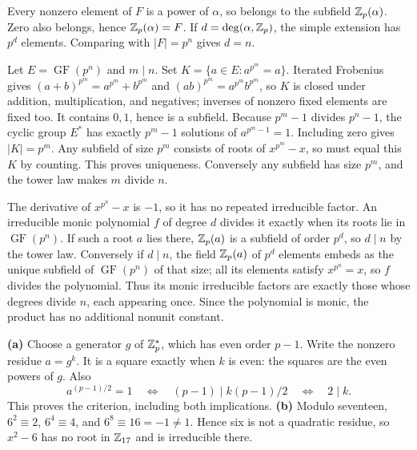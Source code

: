Every nonzero element of $F$ is a power of $\alpha$, so belongs to the subfield $\mathbb{Z}_p(\alpha)$. Zero also belongs, hence $\mathbb{Z}_p(\alpha)=F$. If $d=\deg(\alpha,\mathbb{Z}_p)$, the simple extension has $p^d$ elements. Comparing with $|F|=p^n$ gives $d=n$.

Let $E=\operatorname{GF}(p^n)$ and $m\mid n$. Set $K=\{a\in E:a^{p^m}=a\}$. Iterated Frobenius gives $(a+b)^{p^m}=a^{p^m}+b^{p^m}$ and $(ab)^{p^m}=a^{p^m}b^{p^m}$, so $K$ is closed under addition, multiplication, and negatives; inverses of nonzero fixed elements are fixed too. It contains $0,1$, hence is a subfield.
Because $p^m-1$ divides $p^n-1$, the cyclic group $E^*$ has exactly $p^m-1$ solutions of $a^{p^m-1}=1$. Including zero gives $|K|=p^m$.
Any subfield of size $p^m$ consists of roots of $x^{p^m}-x$, so must equal this $K$ by counting. This proves uniqueness. Conversely any subfield has size $p^m$, and the tower law makes $m$ divide $n$.

The derivative of $x^{p^n}-x$ is $-1$, so it has no repeated irreducible factor. An irreducible monic polynomial $f$ of degree $d$ divides it exactly when its roots lie in $\operatorname{GF}(p^n)$.
If such a root $a$ lies there, $\mathbb{Z}_p(a)$ is a subfield of order $p^d$, so $d\mid n$ by the tower law. Conversely if $d\mid n$, the field $\mathbb{Z}_p(a)$ of $p^d$ elements embeds as the unique subfield of $\operatorname{GF}(p^n)$ of that size; all its elements satisfy $x^{p^n}=x$, so $f$ divides the polynomial. Thus its monic irreducible factors are exactly those whose degrees divide $n$, each appearing once. Since the polynomial is monic, the product has no additional nonunit constant.

\textbf{(a)} Choose a generator $g$ of $\mathbb{Z}_p^*$, which has even order $p-1$. Write the nonzero residue $a=g^k$. It is a square exactly when $k$ is even: the squares are the even powers of $g$. Also
\[a^{(p-1)/2}=1\quad\Longleftrightarrow\quad(p-1)\mid k(p-1)/2\quad\Longleftrightarrow\quad2\mid k.\]
This proves the criterion, including both implications.
\textbf{(b)} Modulo seventeen, $6^2\equiv2$, $6^4\equiv4$, and $6^8\equiv16=-1\ne1$. Hence six is not a quadratic residue, so $x^2-6$ has no root in $\mathbb{Z}_{17}$ and is irreducible there.
